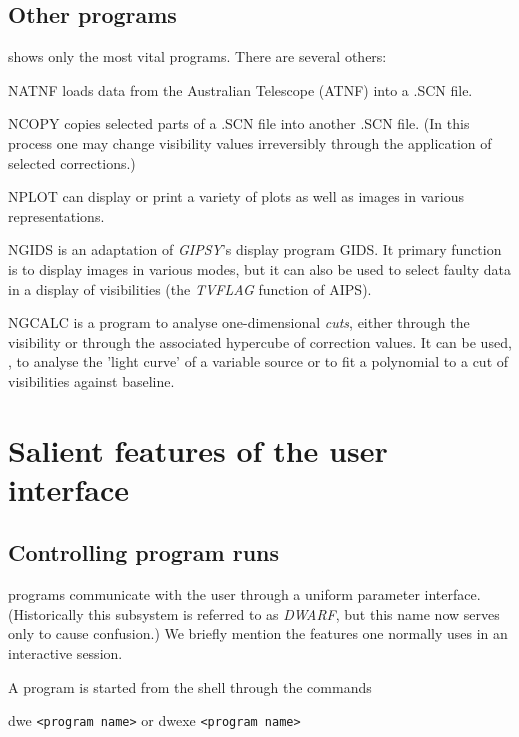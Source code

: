 \subsection{ Other programs}
\label{.other.programs}

	 shows only the most vital programs. There are
several others:

\bi
\item   NATNF loads data from the Australian Telescope (ATNF) into a .SCN file.

\item   NCOPY copies selected parts of a .SCN file into another .SCN file. (In
this process one may change visibility values irreversibly through the
application of selected corrections.)

\item   NPLOT can display or print a variety of plots as well as images in
various representations.

\item   NGIDS is an adaptation of {\em GIPSY}'s display program GIDS. It
primary function is to display images in various modes, but it can also be used
to select faulty data in a display of visibilities (the {\em TVFLAG} function
of AIPS).

\item   NGCALC is a program to analyse one-dimensional {\em cuts}, either
through the visibility  or through the associated
hypercube of correction values. It can be used, \eg, to analyse the 'light
curve' of a variable source or to fit a polynomial to a cut of visibilities
against baseline.
\ei


\section{ Salient features of the user interface }
\label{.user.interface}


\subsection{ Controlling program runs }

	\NEWSTAR programs communicate with the user through a uniform parameter
interface. (Historically this subsystem is referred to as {\em DWARF}, but this
name now serves only to cause confusion.) We briefly mention the features one
normally uses in an interactive session.

\bi
\item   A program is started from the shell through the commands
  \bi
  \item[]       dwe \verb/<program name>/ or dwexe \verb/<program name>/
  \ei

